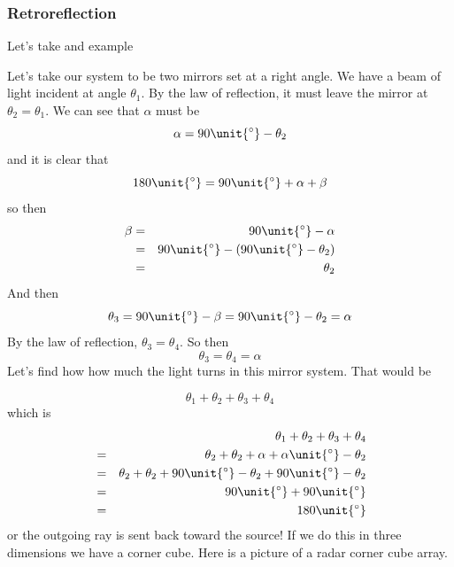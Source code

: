 \documentclass{article}
\begin{document}
\subsubsection{Retroreflection}

Let's take and example

Let's take our system to be two mirrors set at a right angle. We have a beam
of light incident at angle $\theta _{1}$. By the law of reflection, it must
leave the mirror at $\theta _{2}=\theta _{1}.$ We can see that $\alpha $
must be 
\[
\alpha =90\unit{%
{{}^\circ}%
}-\theta _{2}
\]
and it is clear that%
\[
180\unit{%
{{}^\circ}%
}=90\unit{%
{{}^\circ}%
}+\alpha +\beta
\]%
so then 
\begin{eqnarray*}
\beta &=&90\unit{%
{{}^\circ}%
}-\alpha \\
&=&90\unit{%
{{}^\circ}%
}-\left( 90\unit{%
{{}^\circ}%
}-\theta _{2}\right) \\
&=&\theta _{2}
\end{eqnarray*}%
And then 
\[
\theta _{3}=90\unit{%
{{}^\circ}%
}-\beta =90\unit{%
{{}^\circ}%
}-\theta _{2}=\alpha
\]
By the law of reflection, $\theta _{3}=\theta _{4}.$ So then 
\[
\theta _{3}=\theta _{4}=\alpha
\]%
Let's find how how much the light turns in this mirror system. That would be

\[
\theta _{1}+\theta _{2}+\theta _{3}+\theta _{4}
\]%
which is 
\begin{eqnarray*}
&&\theta _{1}+\theta _{2}+\theta _{3}+\theta _{4} \\
&=&\theta _{2}+\theta _{2}+\alpha +\alpha \unit{%
{{}^\circ}%
}-\theta _{2} \\
&=&\theta _{2}+\theta _{2}+90\unit{%
{{}^\circ}%
}-\theta _{2}+90\unit{%
{{}^\circ}%
}-\theta _{2} \\
&=&90\unit{%
{{}^\circ}%
}+90\unit{%
{{}^\circ}%
} \\
&=&180\unit{%
{{}^\circ}%
}
\end{eqnarray*}%
or the outgoing ray is sent back toward the source! If we do this in three
dimensions we have a corner cube. Here is a picture of a radar corner cube
array.
\end{document}
